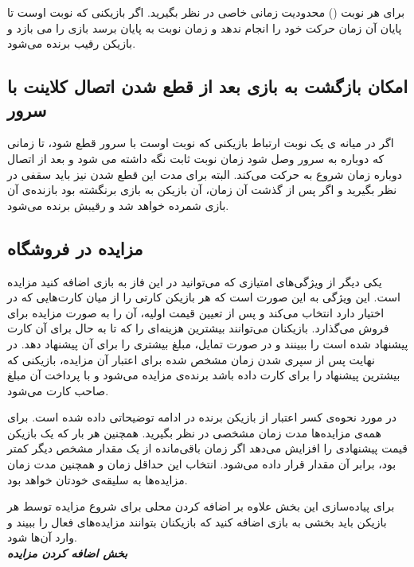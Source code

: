\documentclass[]{article}
\begin{document}
برای هر نوبت () محدودیت زمانی خاصی در نظر بگیرید. اگر بازیکنی که نوبت اوست تا پایان آن زمان حرکت خود را انجام ندهد و زمان نوبت به پایان برسد بازی را می بازد و بازیکن رقیب برنده می‌شود.

\subsection*{{\titr امکان بازگشت به بازی بعد از قطع شدن اتصال کلاینت با سرور}}

اگر در میانه ی یک نوبت ارتباط بازیکنی که نوبت اوست با سرور قطع شود، تا زمانی که دوباره به سرور وصل شود زمان نوبت ثابت نگه داشته می شود و بعد از اتصال دوباره زمان شروع به حرکت می‌کند. البته برای مدت این قطع شدن نیز باید سقفی در نظر بگیرید و اگر پس از گذشت آن زمان، آن بازیکن به بازی برنگشته بود بازنده‌ی آن بازی شمرده خواهد شد و رقیبش برنده می‌شود.

\subsection*{{\titr مزایده در فروشگاه}}

یکی دیگر از ویژگی‌های امتیازی که می‌توانید در این فاز به بازی اضافه کنید مزایده است. این ویژگی به این صورت است که هر بازیکن کارتی را از میان کارت‌هایی که در اختیار دارد انتخاب می‌کند و پس از تعیین قیمت اولیه، آن را به صورت مزایده برای فروش می‌گذارد. بازیکنان می‌توانند بیشترین هزینه‌ای را که تا به حال برای آن کارت پیشنهاد شده است را ببینند و در صورت تمایل، مبلغ بیشتری را برای آن پیشنهاد دهد. در نهایت پس از سپری شدن زمان مشخص شده برای اعتبار آن مزایده، بازیکنی که بیشترین پیشنهاد را برای کارت داده باشد برنده‌ی مزایده می‌شود و با پرداخت آن مبلغ صاحب کارت می‌شود. 

در مورد نحوه‌ی کسر اعتبار از بازیکن برنده در ادامه توضیحاتی ‌داده شده است. برای همه‌ی مزایده‌ها مدت زمان مشخصی در نظر بگیرید. همچنین هر بار که یک بازیکن قیمت پیشنهادی را افزایش می‌دهد اگر زمان باقی‌مانده از یک مقدار مشخص دیگر کمتر بود، برابر آن مقدار قرار داده می‌شود. انتخاب این حداقل زمان و همچنین مدت زمان مزایده‌ها به سلیقه‌ی خودتان خواهد بود.

برای پیاده‌سازی این بخش علاوه بر اضافه کردن محلی برای شروع مزایده توسط هر بازیکن باید بخشی به بازی اضافه کنید که بازیکنان بتوانند مزایده‌های فعال را ببیند و وارد آن‌ها شود.
\\

\textbf{\emph{ بخش اضافه کردن مزایده }}
\end{document}
